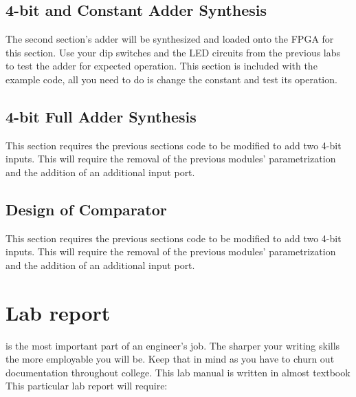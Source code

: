   \subsection{4-bit and Constant Adder Synthesis}
    The second section's adder will be synthesized and loaded onto the FPGA for this section. Use your dip switches and the LED circuits from the previous labs to test the adder for expected operation. This section is included with the example code, all you need to do is change the constant and test its operation.  

  \subsection{4-bit Full Adder Synthesis}
    This section requires the previous sections code to be modified to add two 4-bit inputs. This will require the removal of the previous modules' parametrization and the addition of an additional input port. 

  \subsection{Design of Comparator}
    This section requires the previous sections code to be modified to add two 4-bit inputs. This will require the removal of the previous modules' parametrization and the addition of an additional input port. 

  \section{Lab report}
     is the most important part of an engineer's job. The sharper your writing skills the more employable you will be. Keep that in mind as you have to churn out documentation throughout college. This lab manual is written in almost textbook This particular lab report will require:
